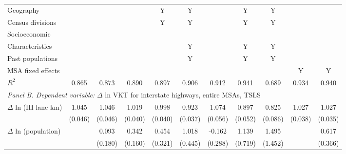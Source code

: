 \begin{table}[htbp]
\begin{tabular}{l*{10}{c}}
           Geography & & & & Y & Y & & Y & Y & & \\            Census divisions & & & & Y & Y & & Y & Y & & \\            Socioeconomic           \\Characteristics & & & & & Y & & Y & Y & & \\            Past populations & & & & & Y & & Y & Y & & \\           MSA fixed effects & & & & & & & & & Y & Y \\                 
\(R^{2}\)           &       0.865         &       0.873         &       0.890         &       0.897         &       0.906         &       0.912         &       0.941         &       0.689         &       0.934         &       0.940         \\
 
          \hline         
\multicolumn{10}{l}{ \emph{Panel B. Dependent variable:} $\Delta$ ln VKT for interstate highways, entire MSAs, TSLS} \\ 
$\Delta$ ln (IH lane km)&       1.045\sym{***}&       1.046\sym{***}&       1.019\sym{***}&       0.998\sym{***}&       0.923\sym{***}&       1.074\sym{***}&       0.897\sym{***}&       0.825\sym{***}&       1.027\sym{***}&       1.027\sym{***}\\
                    &     (0.046)         &     (0.046)         &     (0.040)         &     (0.040)         &     (0.037)         &     (0.056)         &     (0.052)         &     (0.086)         &     (0.038)         &     (0.035)         \\
[1em]
$\Delta$ ln (population)&                     &       0.093         &       0.342\sym{*}  &       0.454         &       1.018\sym{*}  &      -0.162         &       1.139         &       1.495         &                     &       0.617         \\
                    &                     &     (0.180)         &     (0.160)         &     (0.321)         &     (0.445)         &     (0.288)         &     (0.719)         &     (1.452)         &                     &     (0.366)         \\
 

\end{tabular}
\end{table}
